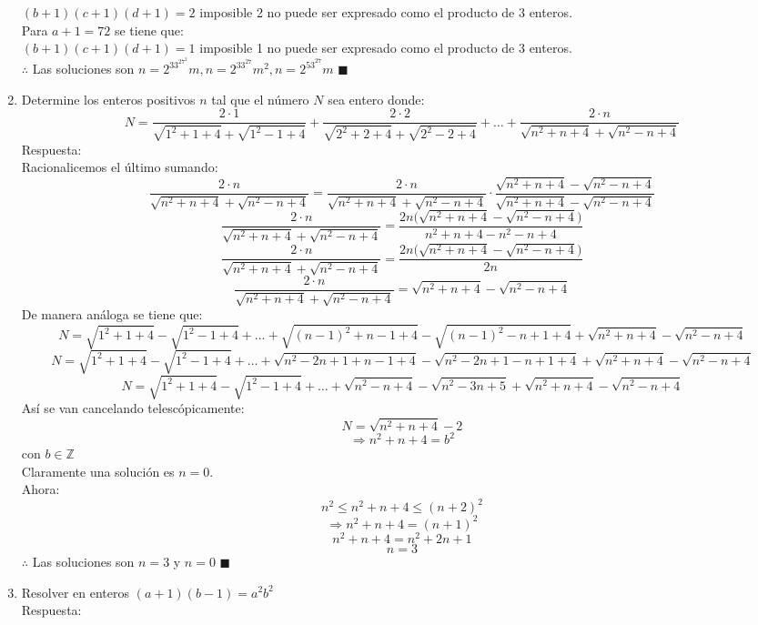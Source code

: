 \documentclass{book}
\newcommand{\Z}{\mathbb{Z}} \def\max{\mathop{\mbox{\rm máx}}} %
\begin{document}
\begin{enumerate}
          $(b + 1)(c + 1)(d + 1) = 2$ imposible 2 no puede ser expresado como el producto de 3 enteros.\\
          Para $a + 1 = 72$ se tiene que: \\
          $(b + 1)(c + 1)(d + 1) = 1$ imposible 1 no puede ser expresado como el producto de 3 enteros. \\
          $\therefore$ Las soluciones son $n= 2^33^27^2m , n= 2^33^27m^2, n= 2^53^27m$ $\blacksquare$\\
    \item Determine los enteros positivos $n$ tal que el número $N$ sea entero donde:
          $$N=\frac{2\cdot1}{\sqrt{1^2+1+4}+\sqrt{1^2-1+4}}+\frac{2\cdot2}{\sqrt{2^2+2+4}+\sqrt{2^2-2+4}}+ \ldots+                                \frac{2\cdot n}{\sqrt{n^2+n+4}+\sqrt{n^2-n+4}}$$
          Respuesta:\\
          Racionalicemos el último sumando:
          $$\frac{2\cdot n}{\sqrt{n^2+n+4}+\sqrt{n^2-n+4}}=\frac{2\cdot n}{\sqrt{n^2+n+4}+\sqrt{n^2-n+4}}\cdot\frac{\sqrt{n^2+n+4}-\sqrt{n^2-n+4}}{\sqrt{n^2+n+4}-\sqrt{n^2-n+4}}$$
          $$\frac{2\cdot n}{\sqrt{n^2+n+4}+\sqrt{n^2-n+4}}=\frac{2n\big(\sqrt{n^2+n+4}-\sqrt{n^2-n+4}\big)}{n^2+n+4-n^2-n+4}$$
          $$\frac{2\cdot n}{\sqrt{n^2+n+4}+\sqrt{n^2-n+4}}=\frac{2n\big(\sqrt{n^2+n+4}-\sqrt{n^2-n+4}\big)}{2n}$$
          $$\frac{2\cdot n}{\sqrt{n^2+n+4}+\sqrt{n^2-n+4}}=\sqrt{n^2+n+4}-\sqrt{n^2-n+4}$$
          De manera análoga se tiene que:
          $$N=\sqrt{1^2+1+4}-\sqrt{1^2-1+4}+\ldots+\sqrt{{(n-1)}^2+n-1+4}-        \sqrt{{(n-1)}^2-n+1+4}+\sqrt{n^2+n+4}-\sqrt{n^2-n+4}$$
          $$N=\sqrt{1^2+1+4}-\sqrt{1^2-1+4}+\ldots+\sqrt{n^2-2n+1+n-1+4}-\sqrt{n^2-2n+1-n+1+4}+\sqrt{n^2+n+4}-\sqrt{n^2-n+4}$$
          $$N=\sqrt{1^2+1+4}-\sqrt{1^2-1+4}+\ldots+\sqrt{n^2-n+4}-\sqrt{n^2-3n+5}+\sqrt{n^2+n+4}-\sqrt{n^2-n+4}$$
          Así se van cancelando telescópicamente:
          $$N= \sqrt{n^2+n+4} - 2$$
          $$\Rightarrow n^2 + n + 4 = b^2$$
          con $b \in \Z$ \\
          Claramente una solución es $n = 0$. \\Ahora:
          $$n^2\leq n^2 + n + 4 \leq {(n+2)}^2$$
          $$\Rightarrow  n^2 + n + 4 ={(n+1)}^2$$
          $$n^2 + n + 4=n^2+2n+1$$
          $$n=3$$
          $\therefore$ Las soluciones son $n = 3$ y $n = 0$ $\blacksquare$\\
    \item  Resolver en enteros $(a+1)(b-1)=a^2b^2$\\
          Respuesta:\\

\end{enumerate}
\end{document}
